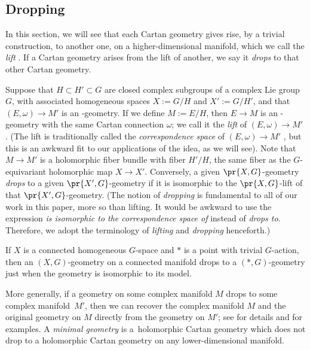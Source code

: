 \documentclass[pdftex]{sigma}
\numberwithin{equation}{section}
\begin{document}
\subsection{Dropping}
In this section, we will see that each Cartan geometry gives rise, by a trivial construction, to another one, on a higher-dimensional manifold, which we call the \emph{lift} \cite[Section 9]{mckay2023introduction}.
If a Cartan geometry arises from the lift of another, we say it \emph{drops} to that other Cartan geometry.

Suppose that $H \subset H' \subset G$ are closed complex subgroups of a complex Lie group $G$, with associated homogeneous
spaces $X := G/H$ and $X' := G/H'$, and that $(E, \omega) \to M'$ is an -geometry.
If we define $M := E/H$, then $E \to M$ is an -geometry with the same Cartan connection $\omega$;
we call it the \emph{lift} of $(E, \omega) \to M'$ \cite[Section~1.5.13]{Cap/Slovak:2009}.
(The lift is traditionally called the \emph{correspondence space} of $(E, \omega) \to M'$ \cite[Section~1.5.13]{Cap/Slovak:2009}, but this is an awkward fit to our applications of the idea, as we will see).
Note that $M \to M'$ is a holomorphic fiber bundle
with fiber $H'/H$, the same fiber as the $G$-equivariant holomorphic map $X \to X'$.
Conversely, a given $\pr{X, G}$-geometry \emph{drops} to a given $\pr{X',G}$-geometry if it is isomorphic to the $\pr{X, G}$-lift
of that $\pr{X', G}$-geometry.
(The notion of \emph{dropping} is fundamental to all of our work in this paper, more so than lifting. It would be awkward to use the expression \emph{is isomorphic to the correspondence space of} instead of \emph{drops to}.
Therefore, we adopt the terminology of \emph{lifting} and \emph{dropping} henceforth.)

\begin{Example}
If $X$ is a connected homogeneous $G$-space and $*$ is a point with trivial $G$-action, then an $(X, G)$-geometry on a
connected manifold drops to a $(*, G)$-geometry just when the geometry is isomorphic to its model.
\end{Example}

More generally, if a geometry on some complex manifold $M$ drops to some complex manifold~$M'$, then we can recover the complex manifold $M$ and the original geometry on $M$ directly from the geometry on $M'$; see \cite{Biswas.McKay:2016} for details and \cite{McKay2011b} for examples.
A \emph{minimal geometry} is a~holomorphic Cartan geometry which does not drop to a holomorphic Cartan geometry on any lower-dimensional manifold.
\end{document}
